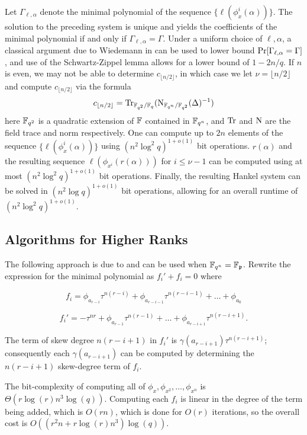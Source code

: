 Let $\Gamma_{\ell, \alpha}$ denote the minimal polynomial of the sequence $\{ \ell (\phi_x^i(\alpha))\}$. The solution to the preceding system is unique and yields the coefficients of the minimal polynomial if and only if $\Gamma_{\ell, \alpha} = \Gamma$. Under a uniform choice of $\ell, \alpha$, a classical argument due to Wiedemann in \cite{Wiedemann:1986:SSL:13738.13744} can be used to lower bound $\textnormal{Pr}[\Gamma_{\ell, \alpha} = \Gamma]$, and use of the Schwartz-Zippel lemma allows for a lower bound of $1-2n/q$. If $n$ is even, we may not be able to determine $c_{\lfloor n/2 \rfloor}$, in which case we let $\nu = \lfloor n/2 \rfloor$ and compute $c_{\lfloor n/2 \rfloor}$ via the formula
\begin{equation*}
    c_{\lfloor n/2 \rfloor} = \textnormal{Tr}_{\F_{q^2}/\F_{q}}(\textnormal{N}_{\L/\F_{q^2}}(\Delta)^{-1})%
\end{equation*}
here $\mathbb{F}_{q^2}$ is a quadratic extension of $\mathbb{F}$ contained in $\mathbb{F}_{q^n}$, and $\textnormal{Tr}$ and $\textnormal{N}$ are the field trace and norm respectively. One can compute up to $2n$ elements of the sequence $\{ \ell (\phi_x^i(\alpha))\}$ using $(n^2 \log^2q)^{1 + o(1)}$ bit operations. $r(\alpha)$ and the resulting sequence $\ell(\phi_{x^i}(r(\alpha)))$ for $i \leq \nu -1$ can be computed using at most $(n^2 \log^2q)^{1 + o(1)}$ bit operations. Finally, the resulting Hankel system can be solved in $(n^2 \log q)^{1 + o(1)}$ bit operations, allowing for an overall runtime of $(n^2 \log^2q)^{1 + o(1)}$. 

\subsection{Algorithms for Higher Ranks}


The following approach is due to \cite{GaraiPapikian} and can be used when $\mathbb{F}_{q^n} = \mathbb{F}_{\frak{p}}$. Rewrite the expression for the minimal polynomial as $f_i' + f_i = 0$ where

\[ f_i = \phi_{a_{r-i}}\tau^{n (r-i)} + \phi_{a_{r - i -1 }}\tau^{n (r-i-1)} + \ldots + \phi_{a_0} \]

\[ f_i' = -\tau^{nr} + \phi_{a_{r -1 }}\tau^{n (r-1)} + \ldots + \phi_{a_{r-i + 1}}\tau^{n(r - i + 1)}. \]

The term of skew degree $n(r - i + 1)$ in $f_i'$ is  $\gamma(a_{r-i+1}) \tau^{n(r-i + 1)}$; consequently each $\gamma(a_{r-i+1})$ can be computed by determining the $n(r - i + 1)$ skew-degree term of $f_i$.

The bit-complexity of computing all of $\phi_x, \phi_{x^2}, \ldots, \phi_{x^n}$ is \newline
$\Theta(r\log(r)n^3\log(q))$. Computing each $f_i$ is linear in the degree of the term being added, which is $O(rn)$, which is done for $O(r)$ iterations, so the overall cost is $O((r^2n + r\log(r)n^3)\log(q) )$.
